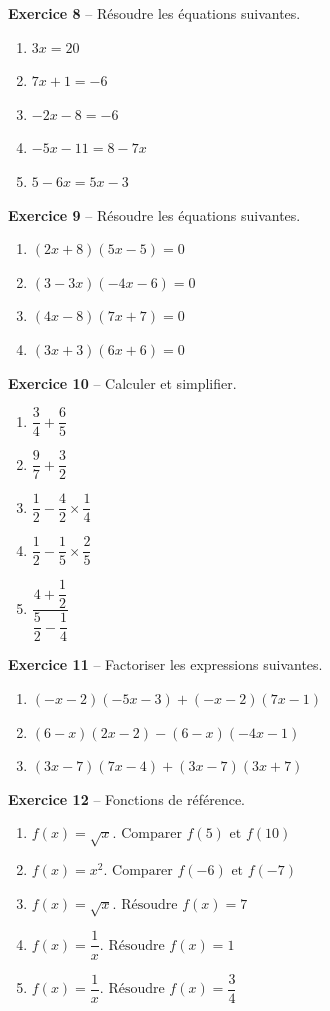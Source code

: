 \documentclass[12pt,a4paper,french]{article}
\begin{document}
\noindent\textbf{Exercice 8} -- Résoudre les équations suivantes.
\begin{enumerate}
\item $3x = 20$
\item $7x + 1 = -6$
\item $-2x - 8 = -6$
\item $-5x - 11 = 8 - 7x$
\item $5 - 6x = 5x - 3$
\end{enumerate}
\bigskip

\noindent\textbf{Exercice 9} -- Résoudre les équations suivantes.
\begin{enumerate}
\item $(2x + 8)(5x - 5) = 0$
\item $(3 - 3x)(-4x - 6) = 0$
\item $(4x - 8)(7x + 7) = 0$
\item $(3x + 3)(6x + 6) = 0$
\end{enumerate}
\bigskip

\noindent\textbf{Exercice 10} -- Calculer et simplifier.
\begin{enumerate}
\item $\dfrac{3}{4} + \dfrac{6}{5}$
\item $\dfrac{9}{7} + \dfrac{3}{2}$
\item $\dfrac{1}{2} - \dfrac{4}{2} \times \dfrac{1}{4}$
\item $\dfrac{1}{2} - \dfrac{1}{5} \times \dfrac{2}{5}$
\item $\dfrac{4 + \dfrac{1}{2}}{\dfrac{5}{2} - \dfrac{1}{4}}$
\end{enumerate}
\bigskip

\noindent\textbf{Exercice 11} -- Factoriser les expressions suivantes.
\begin{enumerate}
\item $(-x - 2)(-5x - 3) + (-x - 2)(7x - 1)$
\item $(6 - x)(2x - 2) - (6 - x)(-4x - 1)$
\item $(3x - 7)(7x - 4) + (3x - 7)(3x + 7)$
\end{enumerate}
\bigskip

\noindent\textbf{Exercice 12} -- Fonctions de référence.
\begin{enumerate}
\item $f(x) = \sqrt{x}. \text{ Comparer } f(5) \text{ et } f(10)$
\item $f(x) = x^2. \text{ Comparer } f(-6) \text{ et } f(-7)$
\item $f(x) = \sqrt{x}. \text{ Résoudre } f(x) = 7$
\item $f(x) = \dfrac{1}{x}. \text{ Résoudre } f(x) = 1$
\item $f(x) = \dfrac{1}{x}. \text{ Résoudre } f(x) = \dfrac{3}{4}$
\end{enumerate}
\bigskip
\end{document}
